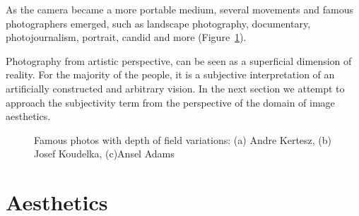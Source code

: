 As the camera became a more portable medium, several movements and famous photographers emerged, such as landscape photography, documentary, photojournalism, portrait, candid and more (Figure~\ref{c2:famous}).

Photography from artistic perspective, can be seen as a superficial dimension of reality. For the majority of the people, it is a subjective interpretation of an artificially constructed and arbitrary vision.
In the next section we attempt to approach the subjectivity term from the perspective of the domain of image aesthetics.

\begin{figure}[ht!]
    \centering  
    \caption{Famous photos with depth of field variations: (a) Andre Kertesz, (b) Josef Koudelka, (c)Ansel Adams}
    \label{c2:famous}
\end{figure}



\section{Aesthetics}
\label{c2:aesthetics}

